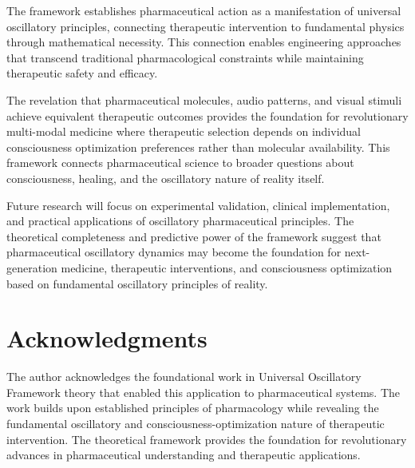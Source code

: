 \documentclass[12pt,a4paper]{article}
\begin{document}
The framework establishes pharmaceutical action as a manifestation of universal oscillatory principles, connecting therapeutic intervention to fundamental physics through mathematical necessity. This connection enables engineering approaches that transcend traditional pharmacological constraints while maintaining therapeutic safety and efficacy.

The revelation that pharmaceutical molecules, audio patterns, and visual stimuli achieve equivalent therapeutic outcomes provides the foundation for revolutionary multi-modal medicine where therapeutic selection depends on individual consciousness optimization preferences rather than molecular availability. This framework connects pharmaceutical science to broader questions about consciousness, healing, and the oscillatory nature of reality itself.

Future research will focus on experimental validation, clinical implementation, and practical applications of oscillatory pharmaceutical principles. The theoretical completeness and predictive power of the framework suggest that pharmaceutical oscillatory dynamics may become the foundation for next-generation medicine, therapeutic interventions, and consciousness optimization based on fundamental oscillatory principles of reality.

\section{Acknowledgments}

The author acknowledges the foundational work in Universal Oscillatory Framework theory that enabled this application to pharmaceutical systems. The work builds upon established principles of pharmacology while revealing the fundamental oscillatory and consciousness-optimization nature of therapeutic intervention. The theoretical framework provides the foundation for revolutionary advances in pharmaceutical understanding and therapeutic applications.
\end{document}
